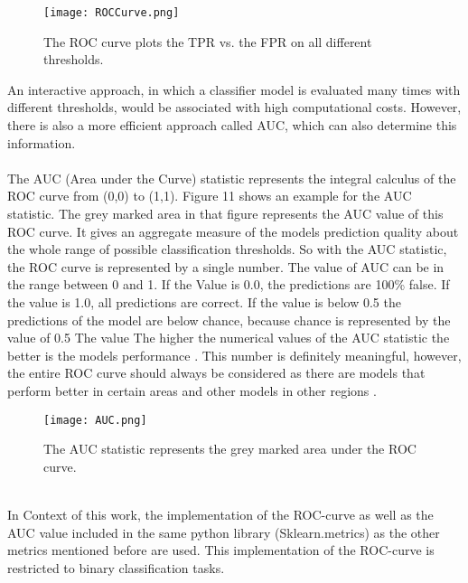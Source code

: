 \documentclass[../masterarbeit.tex]{subfiles}
\begin{document}
\begin{figure}[h]
    \centering
    \texttt{[image: ROCCurve.png]}
    \caption{The ROC curve plots the TPR vs. the FPR on all different thresholds.}
\end{figure}
An interactive approach, in which a classifier model is evaluated many times with different thresholds, would be associated with high computational costs. However, there is also a more efficient approach called AUC, which can also determine this information. \autocite[]{Google_ROC_AUC:2022} \\~\\


The AUC (Area under the Curve) statistic represents the integral calculus of the ROC curve from (0,0) to (1,1). Figure 11 shows an example for the AUC statistic. The grey marked area in that figure represents the AUC value of this ROC curve. It gives an aggregate measure of the models prediction quality about the whole range of possible classification thresholds. So with the AUC statistic, the ROC curve is represented by a single number. The value of AUC can be in the range between 0 and 1. If the Value is 0.0, the predictions are 100\% false. If the value is 1.0, all predictions are correct. If the value is below 0.5 the predictions of the model are below chance, because chance is represented by the value of 0.5 \autocites[]{Google_ROC_AUC:2022, analyticsvidhya_evaluation:2022} The value The higher the numerical values of the AUC statistic the better is the models performance \textcite[]{analyticsvidhya_evaluation:2022}. This number is definitely meaningful, however, the entire ROC curve should always be considered as there are models that perform better in certain areas and other models in other regions \textcite[]{analyticsvidhya_evaluation:2022}. \\




\begin{figure}[h]
    \centering
    \texttt{[image: AUC.png]}
    \caption{The AUC statistic represents the grey marked area under the ROC curve.}
\end{figure} \\

In Context of this work, the implementation of the ROC-curve as well as the AUC value included in the same python library (Sklearn.metrics) as the other metrics mentioned before are used. This implementation of the ROC-curve is restricted to binary classification tasks. \autocite[]{Scikit-learn-roc-curve:2022}
\end{document}
